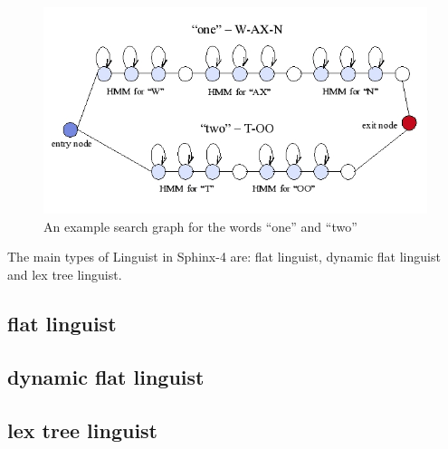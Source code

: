 \begin{figure}[htbp]
  \centering
    \includegraphics[width=1.0\textwidth]{images/hmm.png}
 \caption{An example search graph for the words ``one'' and ``two''}
  \label{fig:hmm}
\end {figure}

The main types of Linguist in Sphinx-4 are: flat linguist, dynamic flat linguist
and lex tree linguist. 

\subsection {flat linguist} 
\subsection {dynamic flat linguist} 
\subsection {lex tree linguist} 









